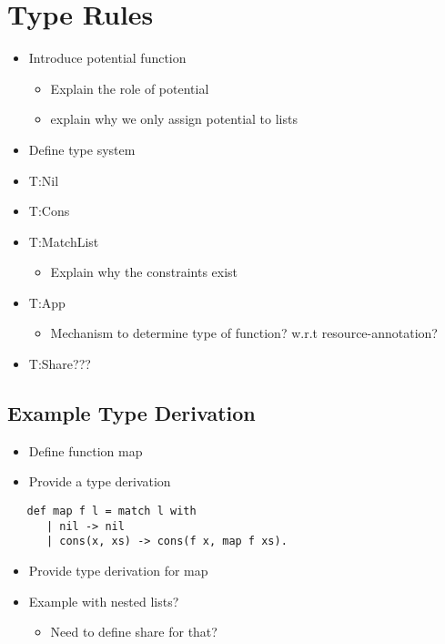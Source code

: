 \section{Type Rules}
\begin{itemize}
   \item Introduce potential function
      \begin{itemize}
         \item Explain the role of potential
         \item explain why we only assign potential to lists
      \end{itemize}
   \item Define type system
   \item T:Nil
   \item T:Cons
   \item T:MatchList
      \begin{itemize}
         \item Explain why the constraints exist
      \end{itemize}
   \item T:App
      \begin{itemize}
         \item Mechanism to determine type of function? w.r.t resource-annotation?
      \end{itemize}
   \item T:Share???
\end{itemize}

\subsection{Example Type Derivation}
\begin{itemize}
   \item Define function map
   \item Provide a type derivation
\end{itemize}

\begin{verbatim}
   def map f l = match l with 
      | nil -> nil
      | cons(x, xs) -> cons(f x, map f xs).
\end{verbatim}

\begin{itemize}
   \item Provide type derivation for map
   \item Example with nested lists?
      \begin{itemize}
         \item Need to define share for that?
      \end{itemize}
\end{itemize}

